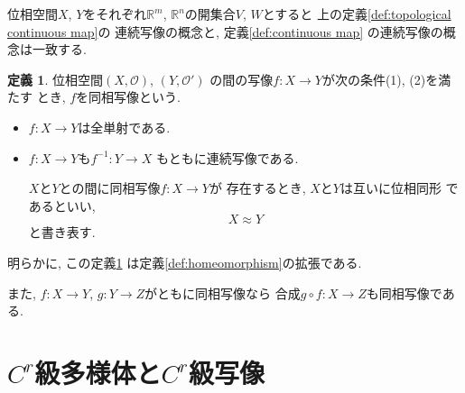 \documentclass[a4j,12pt]{jarticle}
\theoremstyle{definition}
\newtheorem{definition}[theorem]{定義}
\begin{document}
位相空間$X$, $Y$をそれぞれ$\mathbb{R}^m$, 
$\mathbb{R}^n$の開集合$V$, $W$とすると
上の定義\ref{def:topological continuous map}の
連続写像の概念と, 定義\ref{def:continuous map}
の連続写像の概念は一致する. 
\begin{definition}\label{def:topological homeomorphism}
    位相空間$(X,\mathcal{O})$, $(Y,\mathcal{O}')$
    の間の写像$f:X\to Y$が次の条件(1), (2)を満たす
    とき, $f$を同相写像という. 
    \begin{itemize}
        \item[(1)]$f:X\to Y$は全単射である. 
        \item[(2)]$f:X\to Y$も$f^{-1}:Y\to X$
        もともに連続写像である. 

        $X$と$Y$との間に同相写像$f:X\to Y$が
    存在するとき, $X$と$Y$は互いに位相同形
    であるといい, 
    $$X \approx Y$$
    と書き表す. 
    \end{itemize}
\end{definition}
明らかに, この定義\ref{def:topological homeomorphism}
は定義\ref{def:homeomorphism}の拡張である. 

また, $f:X\to Y$, $g:Y\to Z$がともに同相写像なら
合成$g\circ f:X\to Z$も同相写像である. 
\newpage
%
\section{$C^r$級多様体と$C^r$級写像}
\end{document}
